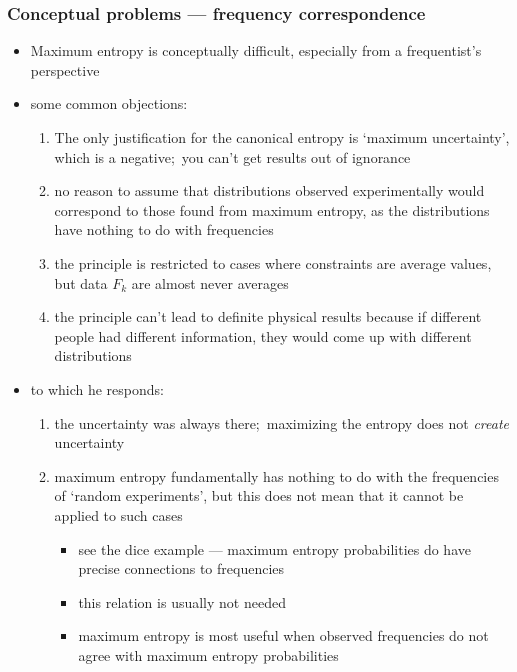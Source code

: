 \documentclass[../jaynes_prob_theory_notes.tex]{subfiles}
\begin{document}
            \subsubsection{Conceptual problems --- frequency correspondence}
                \begin{itemize} 
                    \item Maximum entropy is conceptually difficult, especially from a frequentist's perspective
                    \item some common objections:
                        \begin{enumerate}
                            \item The only justification for the canonical entropy is `maximum uncertainty', which is a negative;\ you can't get results out of ignorance
                            \item no reason to assume that distributions observed experimentally would correspond to those found from maximum entropy, as the distributions have nothing to do with frequencies
                            \item the principle is restricted to cases where constraints are average values, but data \( F_k \) are almost never averages
                            \item the principle can't lead to definite physical results because if different people had different information, they would come up with different distributions
                        \end{enumerate}
                    \item to which he responds:
                        \begin{enumerate}
                            \item the uncertainty was always there;\ maximizing the entropy does not \textit{create} uncertainty
                            \item maximum entropy fundamentally has nothing to do with the frequencies of `random experiments', but this does not mean that it cannot be applied to such cases
                                \begin{itemize}
                                    \item see the dice example --- maximum entropy probabilities do have precise connections to frequencies
                                    \item this relation is usually not needed 
                                    \item maximum entropy is most useful when observed frequencies do not agree with maximum entropy probabilities

\end{itemize}
\end{enumerate}
\end{itemize}
\end{document}
